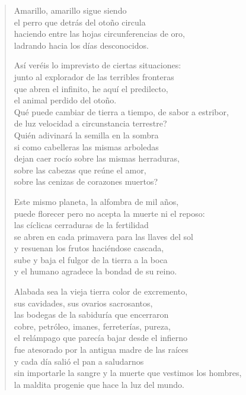 \documentclass[12pt]{article}
\begin{document}
\clearpage
{}
\begin{verse}

Amarillo, amarillo sigue siendo\\
el perro que detrás del otoño circula\\
haciendo entre las hojas circunferencias de oro,\\
ladrando hacia los días desconocidos.  

Así veréis lo imprevisto de ciertas situaciones:\\
junto al explorador de las terribles fronteras\\
que abren el infinito, he aquí el predilecto,\\
el animal perdido del otoño.\\
Qué puede cambiar de tierra a tiempo, de sabor a estribor,\\
de luz velocidad a circunstancia terrestre?\\
Quién adivinará la semilla en la sombra\\
si como cabelleras las mismas arboledas\\
dejan caer rocío sobre las mismas herraduras,\\
sobre las cabezas que reúne el amor,\\
sobre las cenizas de corazones muertos?  

Este mismo planeta, la alfombra de mil años,\\
puede florecer pero no acepta la muerte ni el reposo:\\
las cíclicas cerraduras de la fertilidad\\
se abren en cada primavera para las llaves del sol\\
y resuenan los frutos haciéndose cascada,\\
sube y baja el fulgor de la tierra a la boca\\
y el humano agradece la bondad de su reino.  

Alabada sea la vieja tierra color de excremento,\\
sus cavidades, sus ovarios sacrosantos,\\
las bodegas de la sabiduría que encerraron\\
cobre, petróleo, imanes, ferreterías, pureza,\\
el relámpago que parecía bajar desde el infierno\\
fue atesorado por la antigua madre de las raíces\\
y cada día salió el pan a saludarnos\\
sin importarle la sangre y la muerte que vestimos los hombres,\\
la maldita progenie que hace la luz del mundo.  

\end{verse}
\end{document}
